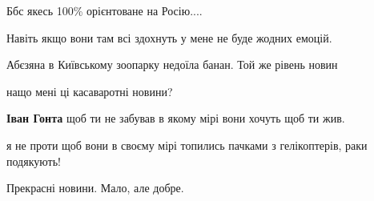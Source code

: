\begin{itemize}
Ббс якесь 100\% орієнтоване на Росію....

 
Навіть якщо вони там всі здохнуть у мене не буде жодних емоцій.

 
Абєзяна в Київському зоопарку недоїла банан. Той же рівень новин

 
нащо мені ці касаваротні новини?

\begin{itemize}
 
\textbf{Іван Гонта} щоб ти не забував в якому мірі вони хочуть щоб ти жив.

\begin{itemize}
 
я не проти щоб вони в своєму мірі топились пачками з гелікоптерів, раки подякують!
\end{itemize}

\end{itemize}

 
Прекрасні новини.
Мало, але добре.


\end{itemize}
